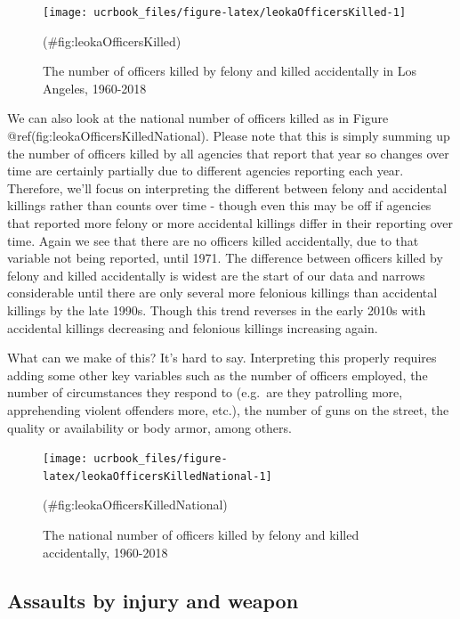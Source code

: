 \documentclass[
  12pt,
  openany]{book}
\begin{document}
\begin{figure}

{\centering \texttt{[image: ucrbook\_files/figure-latex/leokaOfficersKilled-1]} 

}

\caption{The number of officers killed by felony and killed accidentally in Los Angeles, 1960-2018}(\#fig:leokaOfficersKilled)
\end{figure}

We can also look at the national number of officers killed as in Figure @ref(fig:leokaOfficersKilledNational). Please note that this is simply summing up the number of officers killed by all agencies that report that year so changes over time are certainly partially due to different agencies reporting each year. Therefore, we'll focus on interpreting the different between felony and accidental killings rather than counts over time - though even this may be off if agencies that reported more felony or more accidental killings differ in their reporting over time. Again we see that there are no officers killed accidentally, due to that variable not being reported, until 1971. The difference between officers killed by felony and killed accidentally is widest are the start of our data and narrows considerable until there are only several more felonious killings than accidental killings by the late 1990s. Though this trend reverses in the early 2010s with accidental killings decreasing and felonious killings increasing again.

What can we make of this? It's hard to say. Interpreting this properly requires adding some other key variables such as the number of officers employed, the number of circumstances they respond to (e.g.~are they patrolling more, apprehending violent offenders more, etc.), the number of guns on the street, the quality or availability or body armor, among others.

\begin{figure}

{\centering \texttt{[image: ucrbook\_files/figure-latex/leokaOfficersKilledNational-1]} 

}

\caption{The national number of officers killed by felony and killed accidentally, 1960-2018}(\#fig:leokaOfficersKilledNational)
\end{figure}

\hypertarget{assaults-by-injury-and-weapon}{%
\subsection{Assaults by injury and weapon}\label{assaults-by-injury-and-weapon}}
\end{document}
